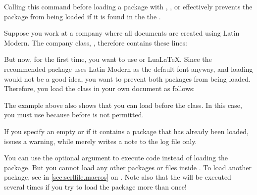 \begin{Declaration}
\end{Declaration}
Calling this command before loading a
package with ,
, or
effectively prevents the package from being loaded if it is found in the the
.
%
\begin{Example}
  Suppose you work at a company where all documents are created using Latin
  Modern. The company class, , therefore contains these lines:
\begin{lstcode}
  \RequirePackage[T1]{fontenc}
  \RequirePackage{lmodern}
\end{lstcode}
  But now, for the first time, you want to use \XeLaTeX{} or Lua\LaTeX{}.
  Since the recommended  package uses Latin Modern as the
  default font anyway, and loading  would not be a good idea,
  you want to prevent both packages from being loaded. Therefore, you load the
  class in your own document as follows:
\end{Example}
The example above also shows that you can load  before the
class. In this case, you must use
 because 
before  is not permitted.

If you specify an empty  or if it contains a package that
has already been loaded,  issues a warning,
while 
merely writes a note to the log file only.

You can use the optional argument to
execute code instead of loading the package. But you cannot load any other
packages or files inside . To load another package, see
 in \autoref{sec:scrlfile.macros} on
. Note also that the
 will be executed several times if you try to load the
package more than once!%
\EndIndexGroup


